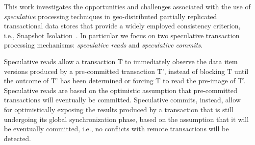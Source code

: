 This work investigates the opportunities and challenges associated with the use of \textit{speculative} processing techniques in geo-distributed partially replicated transactional data stores  that provide a widely employed consistency criterion, i.e., Snapshot Isolation~\cite{clocksi, elnikety2005database}.
In particular we focus on two speculative transaction processing mechanisms: \textit{speculative reads} and \textit{speculative commits}.




Speculative reads  allow a transaction T to immediately observe the  data item versions produced by a pre-committed transaction T', instead of blocking T until the outcome of T' has been determined or forcing T to read the pre-image of T'. Speculative reads are based on the optimistic assumption that pre-committed transactions will eventually be committed. %
%
%
 Speculative commits, instead, allow for optimistically exposing the results produced by a transaction that is still undergoing its global synchronization phase, based on the assumption that it will be eventually committed, i.e., no conflicts with remote transactions will be detected.

